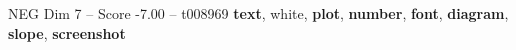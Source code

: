 \begin{textsample}{NEG Dim 7 – Score -7.00 – t008969}  \label{ex:f7_neg_038}
\textbf{text}, white, \textbf{plot}, \textbf{number}, \textbf{font}, \textbf{diagram}, \textbf{slope}, \textbf{screenshot}

\end{textsample}
